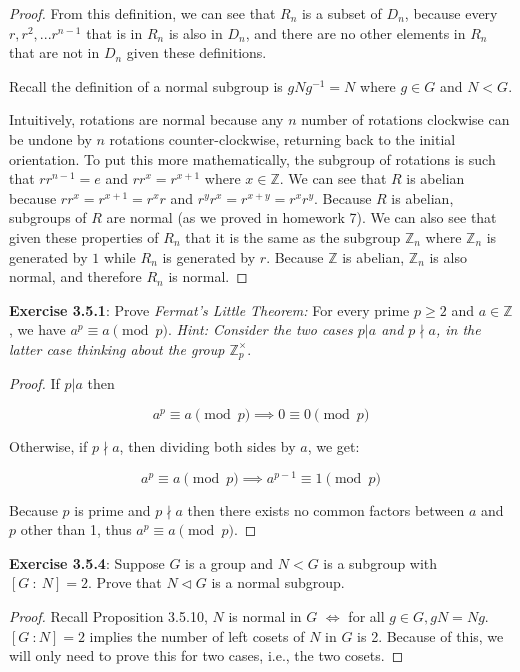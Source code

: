 \documentclass[a4paper]{article}
\begin{document}
\begin{myparindent}{0pt}
\begin{proof}
  From this definition, we can see that $R_n$ is a subset of $D_n$, because
  every $r, r^2, ... r^{n-1}$ that is in $R_n$ is also in $D_n$, and there are
  no other elements in $R_n$ that are not in $D_n$ given these definitions.
  \newline

  Recall the definition of a normal subgroup is $gNg^{-1} = N$ where $g \in G$
  and $N < G$. \newline

  Intuitively, rotations are normal because any $n$ number of rotations
  clockwise can be undone by $n$ rotations counter-clockwise, returning back
  to the initial orientation. To put this more mathematically, the subgroup of
  rotations is such that $rr^{n-1} = e$ and $rr^{x} = r^{x+1}$ where
  $x \in \mathbb{Z}$. We can see that $R$ is abelian because
  $rr^{x} = r^{x+1} = r^{x}r$ and $r^{y}r^{x} = r^{x+y} = r^{x}r^{y}$. Because
  $R$ is abelian, subgroups of $R$ are normal (as we proved in homework 7). We
  can also see that given these properties of $R_n$ that it is the same as the
  subgroup $\mathbb{Z}_n$ where $\mathbb{Z}_n$ is generated by $1$ while $R_n$
  is generated by $r$. Because $\mathbb{Z}$ is abelian, $\mathbb{Z}_n$ is also
  normal, and therefore $R_n$ is normal.
\end{proof}

\textbf{Exercise 3.5.1}:
Prove \textit{Fermat's Little Theorem:} For every prime $p \ge 2$ and
$a \in \mathbb{Z}$, we have $a^p \equiv a \pmod p$. \textit{Hint: Consider the
two cases $p|a$ and $p \nmid a$, in the latter case thinking about the group
$\mathbb{Z}_p^{\times}$}.
\begin{proof}
  If $p | a$ then

  \[ a^p \equiv a \pmod p \implies 0 \equiv 0 \pmod p \]

  Otherwise, if $p \nmid a$, then dividing both sides by $a$, we get:

  \[ a^p \equiv a \pmod p \implies a^{p-1} \equiv 1 \pmod p \]

  Because $p$ is prime and $p \nmid a$ then there exists no common factors
  between $a$ and $p$ other than 1, thus $a^p \equiv a \pmod p$.
\end{proof}

\textbf{Exercise 3.5.4}:
Suppose $G$ is a group and $N < G$ is a subgroup with $[G ~: ~N] = 2$. Prove
that $N \triangleleft G$ is a normal subgroup.
\begin{proof}
  Recall Proposition 3.5.10, $N$ is normal in $G$ $\iff$ for all $g \in G, gN = Ng$.
  \newline
  $[G ~: N] = 2$ implies the number of left cosets of $N$ in $G$ is 2. Because
  of this, we will only need to prove this for two cases, i.e., the two cosets.
  \newline


\end{proof}
\end{myparindent}
\end{document}
